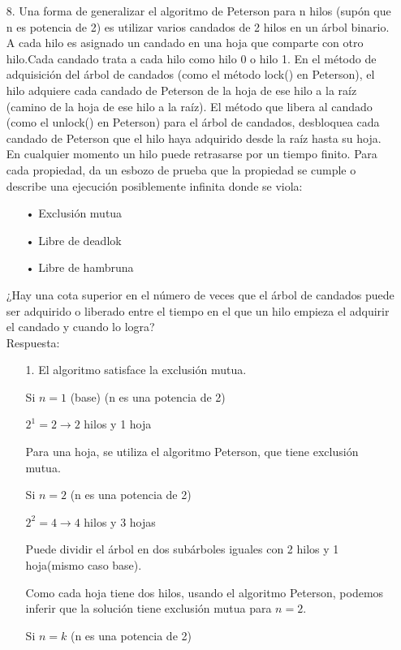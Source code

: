 \documentclass[12pt, letterpaper]{article}
\begin{document}
\begin{itemize}
\item[8. ]Una forma de generalizar el algoritmo de Peterson para n hilos (sup\'on que n es potencia de 2) es utilizar varios candados de 2 hilos en un \'arbol binario.
A cada hilo es asignado un candado en una hoja que comparte con otro hilo.Cada candado trata a cada hilo como hilo 0 o hilo 1.
En el m\'etodo de adquisici\'on del \'arbol de candados (como el m\'etodo lock() en Peterson), el hilo adquiere cada candado de Peterson de la hoja de ese hilo a la ra\'iz (camino de la hoja de ese hilo a la ra\'iz). El m\'etodo que libera al candado (como el unlock() en Peterson) para el \'arbol de candados, desbloquea cada candado de Peterson que el hilo haya adquirido desde la ra\'iz hasta su hoja. En cualquier momento un hilo puede retrasarse por un tiempo finito. Para cada propiedad, da un esbozo de prueba que la propiedad se cumple o describe una ejecución posiblemente infinita donde se viola:
\begin{itemize}
\item[•] Exclusi\'on mutua
\item[•] Libre de deadlok
\item[•] Libre de hambruna
\end{itemize}
¿Hay una cota superior en el n\'umero de veces que el \'arbol de candados puede ser adquirido o liberado entre el tiempo en el que un hilo empieza el adquirir el candado y cuando lo logra?\\
Respuesta:\\
\begin{itemize}


\item[1. ]El algoritmo satisface la exclusi\'on mutua.

Si $n = 1$ (base) (n es una potencia de 2)

$2^{1} = 2 \rightarrow 2$ hilos y 1 hoja

Para una hoja, se utiliza el algoritmo Peterson, que tiene exclusi\'on mutua.

Si $n = 2$ (n es una potencia de 2)

$2^{2} = 4 \rightarrow 4$ hilos y 3 hojas

Puede dividir el \'arbol en dos sub\'arboles iguales con 2 hilos y 1 hoja(mismo caso base).

Como cada hoja tiene dos hilos, usando el algoritmo Peterson, podemos inferir que la soluci\'on tiene exclusi\'on mutua para $n = 2$.

Si $n = k$ (n es una potencia de 2)


\end{itemize}
\end{itemize}
\end{document}
